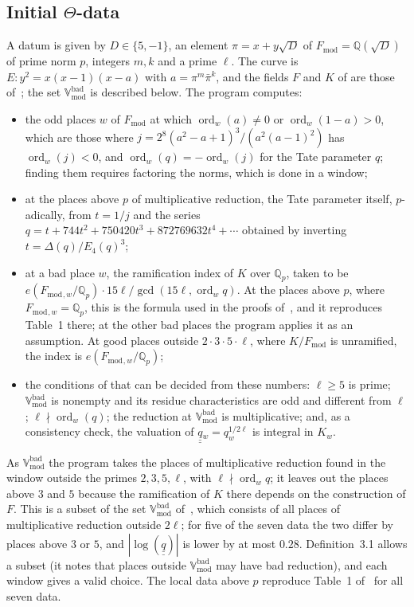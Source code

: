 \documentclass[11pt,a4paper]{article}
\newcommand{\qq}{\underline{\underline{q}}{}}
\newcommand{\Q}{\mathbb{Q}}
\newcommand{\ord}{\operatorname{ord}}
\newcommand{\Fmod}{F_{\mathrm{mod}}}
\newcommand{\Vbad}{\mathbb{V}^{\mathrm{bad}}_{\mathrm{mod}}}
\begin{document}
\subsection{Initial \texorpdfstring{$\Theta$}{Theta}-data}\label{sec:data}
A datum is given by $D\in\{5,-1\}$, an element $\pi=x+y\sqrt D$ of $\Fmod=\Q(\sqrt D)$ of prime norm $p$, integers
$m,k$ and a prime $\ell$. The curve is $E\colon y^2=x(x-1)(x-a)$ with $a=\pi^m\bar\pi^k$, and the fields $F$ and
$K$ of \cite[Def.~3.1]{IUT1} are those of~\cite{Cat}; the set $\Vbad$ is described below. The program computes:
\begin{itemize}
\item the odd places $w$ of $\Fmod$ at which $\ord_w(a)\ne0$ or $\ord_w(1-a)>0$, which are those where
  $j=2^8(a^2-a+1)^3/(a^2(a-1)^2)$ has $\ord_w(j)<0$, and $\ord_w(q)=-\ord_w(j)$ for the Tate parameter $q$; finding
  them requires factoring the norms, which is done in a window;
\item at the places above $p$ of multiplicative reduction, the Tate parameter itself, $p$-adically, from $t=1/j$ and the series
  $q=t+744t^2+750420t^3+872769632t^4+\cdots$ obtained by inverting $t=\Delta(q)/E_4(q)^3$;
\item at a bad place $w$, the ramification index of $K$ over $\Q_p$, taken to be
  $e(\Fmod{}_{,w}/\Q_p)\cdot15\ell/\gcd(15\ell,\ord_w q)$. At the places above $p$, where
  $\Fmod{}_{,w}=\Q_p$, this is the formula used in the proofs of~\cite[App.~A]{Cat}, and it reproduces Table~1 there; at the other bad places the
  program applies it as an assumption. At good places outside $2\cdot3\cdot5\cdot\ell$, where $K/\Fmod$ is
  unramified, the index is $e(\Fmod{}_{,w}/\Q_p)$;
\item the conditions of \cite[Def.~3.1]{IUT1} that can be decided from these numbers: $\ell\ge5$ is prime;
  $\Vbad$ is nonempty and its residue characteristics are odd and different from $\ell$; $\ell\nmid\ord_w(q)$;
  the reduction at $\Vbad$ is multiplicative; and, as a consistency check, the valuation of
  $\qq_w=q_w^{1/2\ell}$ \cite[Ex.~3.2(iv)]{IUT1} is integral in $K_w$.
\end{itemize}
As $\Vbad$ the program takes the places of multiplicative reduction found in the window outside the primes
$2,3,5,\ell$, with $\ell\nmid\ord_w q$; it leaves out the places above $3$ and $5$ because the ramification of $K$
there depends on the construction of $F$. This is a subset of the set $\Vbad$ of~\cite{Cat}, which consists of all
places of multiplicative reduction outside $2\ell$; for five of the seven data the two differ by places above $3$ or
$5$, and $|\log(\qq)|$ is lower by at most $0.28$. Definition~3.1 allows a subset (it notes that places outside
$\Vbad$ may have bad reduction), and each window gives a valid choice. The local data above $p$ reproduce Table~1
of~\cite{Cat} for all seven data.
\end{document}
